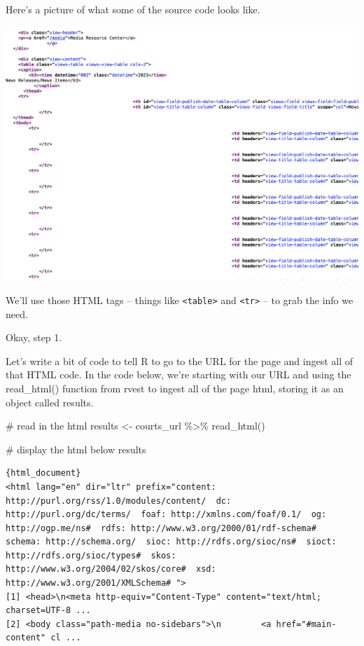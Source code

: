 \documentclass[
  letterpaper,
  DIV=11,
  numbers=noendperiod]{scrreprt}
\newenvironment{Shaded}{\begin{snugshade}}{\end{snugshade}}
\newcommand{\CommentTok}[1]{\textcolor[rgb]{0.37,0.37,0.37}{#1}}
\newcommand{\FunctionTok}[1]{\textcolor[rgb]{0.28,0.35,0.67}{#1}}
\newcommand{\NormalTok}[1]{\textcolor[rgb]{0.00,0.23,0.31}{#1}}
\newcommand{\OtherTok}[1]{\textcolor[rgb]{0.00,0.23,0.31}{#1}}
\newcommand{\SpecialCharTok}[1]{\textcolor[rgb]{0.37,0.37,0.37}{#1}}
\begin{document}
Here's a picture of what some of the source code looks like.

\includegraphics[width=7.08in,height=\textheight]{./images/rvest2.png}

We'll use those HTML tags -- things like
\texttt{\textless{}table\textgreater{}} and
\texttt{\textless{}tr\textgreater{}} -- to grab the info we need.

Okay, step 1.

Let's write a bit of code to tell R to go to the URL for the page and
ingest all of that HTML code. In the code below, we're starting with our
URL and using the read\_html() function from rvest to ingest all of the
page html, storing it as an object called results.

\begin{Shaded}
\begin{Highlighting}[]
\CommentTok{\# read in the html}
\NormalTok{results }\OtherTok{\textless{}{-}}\NormalTok{ courts\_url }\SpecialCharTok{\%\textgreater{}\%}
  \FunctionTok{read\_html}\NormalTok{()}

\CommentTok{\# display the html below}
\NormalTok{results}
\end{Highlighting}
\end{Shaded}

\begin{verbatim}
{html_document}
<html lang="en" dir="ltr" prefix="content: http://purl.org/rss/1.0/modules/content/  dc: http://purl.org/dc/terms/  foaf: http://xmlns.com/foaf/0.1/  og: http://ogp.me/ns#  rdfs: http://www.w3.org/2000/01/rdf-schema#  schema: http://schema.org/  sioc: http://rdfs.org/sioc/ns#  sioct: http://rdfs.org/sioc/types#  skos: http://www.w3.org/2004/02/skos/core#  xsd: http://www.w3.org/2001/XMLSchema# ">
[1] <head>\n<meta http-equiv="Content-Type" content="text/html; charset=UTF-8 ...
[2] <body class="path-media no-sidebars">\n        <a href="#main-content" cl ...
\end{verbatim}
\end{document}
